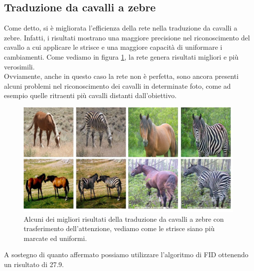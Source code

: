 \subsection{Traduzione da cavalli a zebre}
Come detto, si è migliorata l'efficienza della rete nella traduzione da cavalli a zebre. Infatti, i risultati mostrano una maggiore precisione nel riconoscimento del cavallo a cui applicare le strisce e una maggiore capacità di uniformare i cambiamenti. Come vediamo in figura \ref{fig:Risultati Zebre CycleGan + GradCam}, la rete genera risultati migliori e più verosimili.
\\Ovviamente, anche in questo caso la rete non è perfetta, sono ancora presenti alcuni problemi nel riconoscimento dei cavalli in determinate foto, come ad esempio quelle ritraenti più cavalli distanti dall'obiettivo.

\begin{figure}[H]
\begin{center}
\includegraphics[width=1\columnwidth]{images/CycleGan + GradCam zebre.jpeg} 
\end{center}
\caption{Alcuni dei migliori risultati della traduzione da cavalli a zebre con trasferimento dell'attenzione, vediamo come le strisce siano più marcate ed uniformi.}
\label{fig:Risultati Zebre CycleGan + GradCam}
\end{figure} 

A sostegno di quanto affermato possiamo utilizzare l'algoritmo di FID ottenendo un risultato di 27.9.

